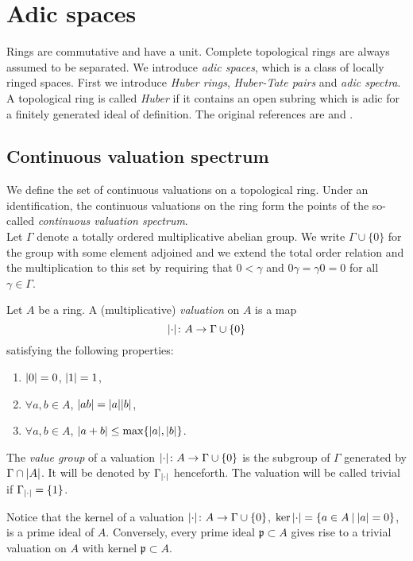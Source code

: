 \chapter{Adic spaces}
Rings are commutative and have a unit. Complete topological rings are always assumed to be separated.
We introduce \emph{adic spaces}, which is a class of locally ringed spaces.
First we introduce \emph{Huber rings}, \emph{Huber-Tate pairs} and \emph{adic spectra}. A topological ring is called \emph{Huber} if it contains an open subring which is adic for a finitely generated ideal of definition. The original references are \cite{Huber93} and \cite{Huber94}. %


\section{Continuous valuation spectrum}
We define the set of continuous valuations on a topological ring. Under an identification, the continuous valuations on the ring form the points of the so-called
\emph{continuous valuation spectrum}.\\

Let $\Gamma$ denote a totally ordered multiplicative abelian group. We write $\Gamma\cup\{0\}$ for the group with some element adjoined and we extend the total order relation and the multiplication to this set by requiring that
 $0<\gamma$ and $0\gamma = \gamma0 =  0$ for all $\gamma\in\Gamma$.

\begin{definition}
Let $A$ be a ring.
A (multiplicative) \emph{valuation} on $A$ is a map
\[\lvert\cdot\rvert\colon A\to\Gamma\cup\{0\}\]
satisfying the following properties:
\begin{enumerate}
\item $\lvert0\rvert=0$, $\lvert1\rvert=1$,
\item $\forall a,b\in A$, $\lvert ab\rvert=\lvert a\rvert\lvert b\rvert$,
\item $\forall a,b\in A$, $\lvert a+b\rvert\leq\max\{\lvert a\rvert,\lvert b\rvert\}$.
\end{enumerate}
\vspace{2mm}
The \emph{value group} of a valuation $\lvert\cdot\rvert\colon A\to\Gamma\cup\{0\}$ is the subgroup of $\Gamma$ generated by $\Gamma\cap\lvert A\rvert$.
It will be denoted by $\Gamma_{\lvert\cdot\rvert}$ henceforth. The valuation will be called trivial if $\Gamma_{\lvert\cdot\rvert}=\{1\}$. 
\end{definition}

Notice that the kernel of a valuation $\lvert\cdot\rvert\colon A\to\Gamma\cup\{0\}$, $\ker{\lvert\cdot\rvert}=\{a\in A \:\vert \:\lvert a\rvert=0\}$,   is a prime ideal of $A$. 
Conversely, every prime ideal $\mathfrak{p}\subset A$ gives rise to a trivial valuation on $A$ with kernel $\mathfrak{p}\subset A$.\\

